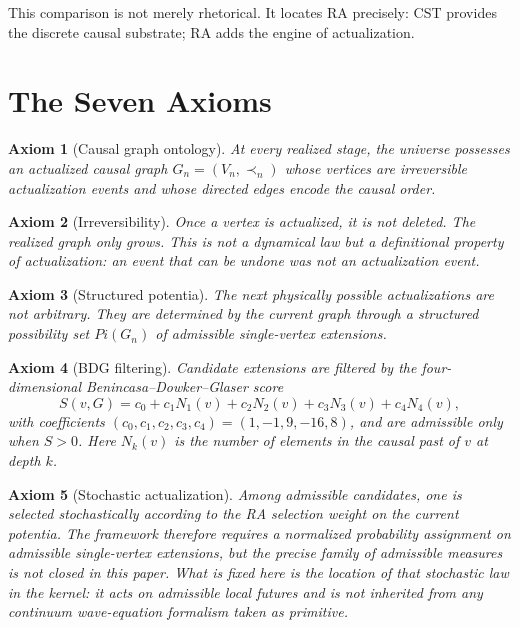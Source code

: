 \documentclass[11pt]{article}
\def\Pi{Pi}%
\newtheorem{axiom}{Axiom}
\newcommand{\Pot}{\ensuremath{\Pi}}
\begin{document}
This comparison is not merely rhetorical. It locates RA precisely: CST provides the discrete causal substrate; RA adds the engine of actualization.


\section{The Seven Axioms}

\label{sec:axioms}

\begin{axiom}[Causal graph ontology]
\label{ax:graph}
At every realized stage, the universe possesses an actualized causal graph $G_n=(V_n,\prec_n)$ whose vertices are irreversible actualization events and whose directed edges encode the causal order.
\end{axiom}

\begin{axiom}[Irreversibility]
\label{ax:irrev}
Once a vertex is actualized, it is not deleted. The realized graph only grows. This is not a dynamical law but a definitional property of actualization: an event that can be undone was not an actualization event.
\end{axiom}

\begin{axiom}[Structured potentia]
\label{ax:potentia}
The next physically possible actualizations are not arbitrary. They are determined by the current graph through a structured possibility set $\Pot(G_n)$ of admissible single-vertex extensions.
\end{axiom}

\begin{axiom}[BDG filtering]
\label{ax:bdg}
Candidate extensions are filtered by the four-dimensional Benincasa--Dowker--Glaser score
\begin{equation}
\label{eq:bdg}
S(v,G)=c_0 + c_1 N_1(v)+c_2 N_2(v)+c_3 N_3(v)+c_4 N_4(v),
\end{equation}
with coefficients $(c_0,c_1,c_2,c_3,c_4)=(1,-1,9,-16,8)$, and are admissible only when $S>0$. Here $N_k(v)$ is the number of elements in the causal past of $v$ at depth $k$.
\end{axiom}

\begin{axiom}[Stochastic actualization]
\label{ax:stochastic}
Among admissible candidates, one is selected stochastically according to the RA selection weight on the current potentia. The framework therefore requires a normalized probability assignment on admissible single-vertex extensions, but the precise family of admissible measures is not closed in this paper. What is fixed here is the location of that stochastic law in the kernel: it acts on admissible local futures and is not inherited from any continuum wave-equation formalism taken as primitive.
\end{axiom}
\end{document}
